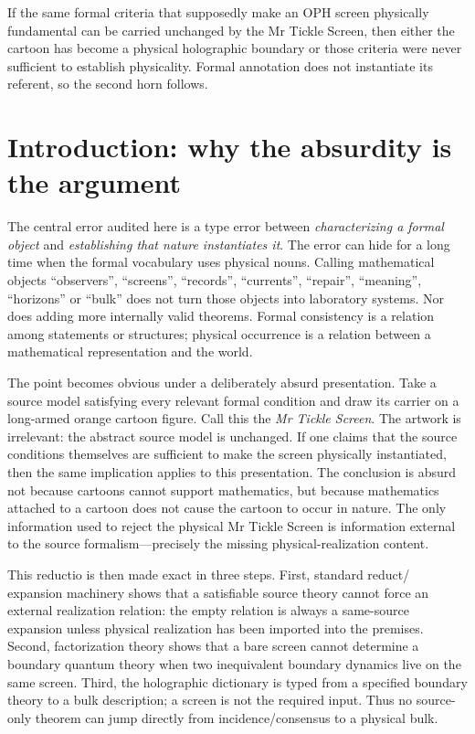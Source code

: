 \documentclass[10pt,a4paper]{article}
\theoremstyle{definition}
\theoremstyle{remark}
\begin{document}
\begin{summarybox}
If the same formal criteria that supposedly make an OPH screen physically
fundamental can be carried unchanged by the Mr Tickle Screen, then either the
cartoon has become a physical holographic boundary or those criteria were
never sufficient to establish physicality.  Formal annotation does not
instantiate its referent, so the second horn follows.
\end{summarybox}

\tableofcontents
\clearpage

\section{Introduction: why the absurdity is the argument}

The central error audited here is a type error between \emph{characterizing a
formal object} and \emph{establishing that nature instantiates it}.  The error
can hide for a long time when the formal vocabulary uses physical nouns.
Calling mathematical objects ``observers'', ``screens'', ``records'',
``currents'', ``repair'', ``meaning'', ``horizons'' or ``bulk'' does not turn
those objects into laboratory systems.  Nor does adding more internally valid
theorems.  Formal consistency is a relation among statements or structures;
physical occurrence is a relation between a mathematical representation and
the world.

The point becomes obvious under a deliberately absurd presentation.  Take a
source model satisfying every relevant formal condition and draw its carrier
on a long-armed orange cartoon figure.  Call this the \emph{Mr Tickle Screen}.
The artwork is irrelevant: the abstract source model is unchanged.  If one
claims that the source conditions themselves are sufficient to make the
screen physically instantiated, then the same implication applies to this
presentation.  The conclusion is absurd not because cartoons cannot support
mathematics, but because mathematics attached to a cartoon does not cause the
cartoon to occur in nature.  The only information used to reject the physical
Mr Tickle Screen is information external to the source formalism---precisely
the missing physical-realization content.

This reductio is then made exact in three steps.  First, standard reduct/
expansion machinery shows that a satisfiable source theory cannot force an
external realization relation: the empty relation is always a same-source
expansion unless physical realization has been imported into the premises.
Second, factorization theory shows that a bare screen cannot determine a
boundary quantum theory when two inequivalent boundary dynamics live on the
same screen.  Third, the holographic dictionary is typed from a specified
boundary theory to a bulk description; a screen is not the required input.
Thus no source-only theorem can jump directly from incidence/consensus to a
physical bulk.
\end{document}
